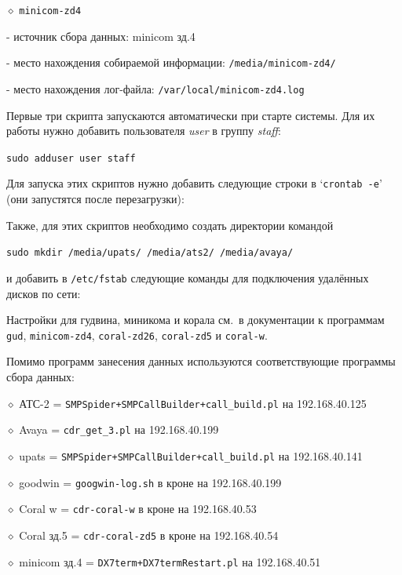 \noindent $\diamond$ {\tt minicom-zd4}
\item{} - источник сбора данных: minicom зд.4
\item{} - место нахождения собираемой информации: {\tt /media/minicom-zd4/}
\item{} - место нахождения лог-файла: {\tt /var/local/minicom-zd4.log}
\bigskip

\noindent
Первые три скрипта запускаются автоматически при старте системы.
Для их работы нужно добавить пользователя {\sl user\/} в
группу {\sl staff\/}: \hfil\break
\centerline{\tt sudo adduser user staff}
\medskip

\noindent
Для запуска этих скриптов нужно добавить следующие строки в `{\tt crontab -e}'
(они запустятся после перезагрузки): \hfil\break
{} \hfil\break
{} \hfil\break
{} \par
\medskip

\noindent
Также, для этих скриптов необходимо создать директории командой \hfil\break
\centerline{\tt sudo mkdir /media/upats/ /media/ats2/ /media/avaya/}
и добавить в {\tt /etc/fstab} следующие команды для подключения удалённых дисков
по сети: \par
{} \hfil\break
{} \hfil\break
{}\par
\medskip

\noindent
Настройки для гудвина, миникома и корала см.\ в документации к программам {\tt gud},
{\tt minicom-zd4}, {\tt coral-zd26}, {\tt coral-zd5} и {\tt coral-w}.
\bigskip

\noindent Помимо программ занесения данных используются соответствующие программы сбора данных:

\noindent $\diamond$ АТС-2 = {\tt SMPSpider+SMPCallBuilder+call\_build.pl} на 192.168.40.125 \par
\noindent $\diamond$ Avaya = {\tt cdr\_get\_3.pl} на 192.168.40.199 \par
\noindent $\diamond$ upats = {\tt SMPSpider+SMPCallBuilder+call\_build.pl} на 192.168.40.141 \par %
\noindent $\diamond$ goodwin = {\tt googwin-log.sh} в кроне на 192.168.40.199 \par
\noindent $\diamond$ Coral w = {\tt cdr-coral-w} в кроне на 192.168.40.53 \par %
\noindent $\diamond$ Coral зд.5 = {\tt cdr-coral-zd5} в кроне на 192.168.40.54 \par %
\noindent $\diamond$ minicom зд.4 = {\tt DX7term+DX7termRestart.pl} на 192.168.40.51 %

\vfill
\eject
\bye
